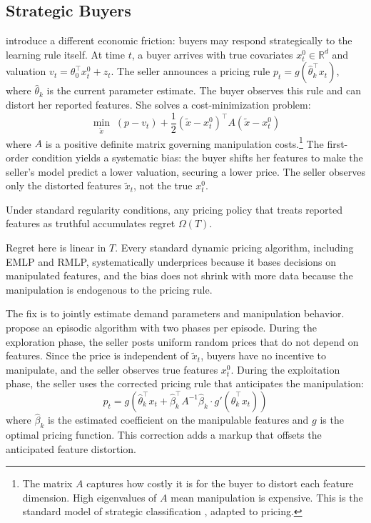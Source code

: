 \subsection{Strategic Buyers}
\label{sec:liu}

\citet{Liu2024strategic} introduce a different economic friction: buyers may respond strategically to the learning rule itself. At time $t$, a buyer arrives with true covariates $x_t^0 \in \mathbb{R}^d$ and valuation $v_t = \theta_0^\top x_t^0 + z_t$. The seller announces a pricing rule $p_t = g(\hat{\theta}_k^\top x_t)$, where $\hat{\theta}_k$ is the current parameter estimate. The buyer observes this rule and can distort her reported features. She solves a cost-minimization problem:
\begin{equation}
\label{eq:manipulation}
\min_{\tilde{x}} \; (p - v_t) + \frac{1}{2}(\tilde{x} - x_t^0)^\top A (\tilde{x} - x_t^0)
\end{equation}
where $A$ is a positive definite matrix governing manipulation costs.\footnote{The matrix $A$ captures how costly it is for the buyer to distort each feature dimension. High eigenvalues of $A$ mean manipulation is expensive. This is the standard model of strategic classification \citep{Hardt2016}, adapted to pricing.} The first-order condition yields a systematic bias: the buyer shifts her features to make the seller's model predict a lower valuation, securing a lower price. The seller observes only the distorted features $\tilde{x}_t$, not the true $x_t^0$.

\begin{theorem}
\label{thm:liu_impossibility}
Under standard regularity conditions, any pricing policy that treats reported features as truthful accumulates regret $\Omega(T)$.
\end{theorem}

Regret here is linear in $T$. Every standard dynamic pricing algorithm, including EMLP and RMLP, systematically underprices because it bases decisions on manipulated features, and the bias does not shrink with more data because the manipulation is endogenous to the pricing rule.

The fix is to jointly estimate demand parameters and manipulation behavior. \citet{Liu2024strategic} propose an episodic algorithm with two phases per episode. During the exploration phase, the seller posts uniform random prices that do not depend on features. Since the price is independent of $\tilde{x}_t$, buyers have no incentive to manipulate, and the seller observes true features $x_t^0$. During the exploitation phase, the seller uses the corrected pricing rule that anticipates the manipulation:
\begin{equation}
\label{eq:strategic_price}
p_t = g\left(\hat{\theta}_k^\top x_t + \hat{\beta}_k^\top A^{-1} \hat{\beta}_k \cdot g'(\hat{\theta}_k^\top x_t)\right)
\end{equation}
where $\hat{\beta}_k$ is the estimated coefficient on the manipulable features and $g$ is the optimal pricing function. This correction adds a markup that offsets the anticipated feature distortion.

